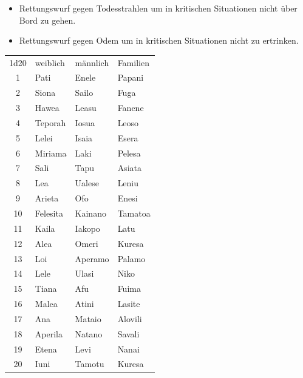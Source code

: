 \documentclass[11pt]{wbzine}
\begin{document}
\begin{multicols}{2}
\begin{itemize}
\item Rettungswurf gegen Todesstrahlen um in kritischen Situationen
nicht über Bord zu gehen.

\item Rettungswurf gegen Odem um in kritischen Situationen nicht zu
ertrinken.
\end{itemize}

\begin{tabularx}{\columnwidth}{clll}
    1d20 &  weiblich    &    männlich    &    Familien \\
    1   &    Pati       &     Enele      &     Papani \\
    2    &   Siona      &     Sailo      &     Fuga\\
    3   &    Hawea      &     Leasu      &     Fanene\\
    4    &   Teporah    &     Iosua      &     Leoso\\
    5     &  Lelei      &     Isaia      &     Esera\\
    6     &  Miriama   &      Laki       &     Pelesa\\
    7     &  Sali      &      Tapu       &     Asiata\\
    8     &  Lea       &      Ualese     &     Leniu\\
    9      & Arieta    &      Ofo        &     Enesi\\
    10     & Felesita  &      Kainano    &     Tamatoa\\
    11     & Kaila     &      Iakopo     &     Latu\\
    12    &  Alea      &      Omeri      &     Kuresa\\
    13    &  Loi       &      Aperamo    &     Palamo\\
    14    &  Lele      &      Ulasi      &     Niko\\
    15     & Tiana     &      Afu        &     Fuima\\
    16     & Malea     &      Atini      &     Lasite\\
    17     & Ana       &      Mataio     &     Alovili\\
    18     & Aperila   &      Natano     &     Savali\\
    19     & Etena     &      Levi       &     Nanai\\
    20     & Iuni      &      Tamotu     &     Kuresa\\
\end{tabularx}


\end{multicols}
\end{document}
